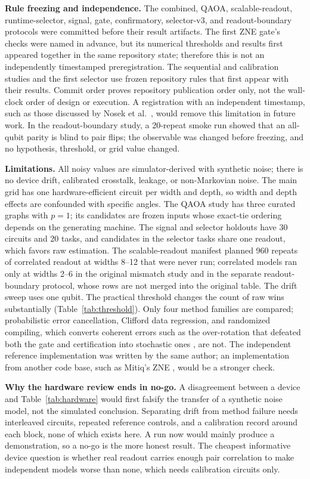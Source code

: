 \documentclass[10pt,twocolumn]{article}
\newcommand{\paragraphlead}[1]{\textbf{#1}\quad}
\begin{document}
\paragraphlead{Rule freezing and independence.}
The combined, QAOA, scalable-readout, runtime-selector, signal, gate, confirmatory, selector-v3, and
readout-boundary protocols were committed before their result artifacts. The first ZNE gate's checks
were named in advance, but its numerical thresholds and results first appeared together in the same
repository state; therefore this is not an independently timestamped preregistration. The
sequential and calibration studies and the first selector use frozen repository rules that first
appear with their results. Commit order proves repository publication order only, not the
wall-clock order of design or execution. A registration with an independent timestamp, such as those
discussed by Nosek et al.\ \cite{nosek2018}, would remove this limitation in future work. In the readout-boundary study, a 20-repeat smoke run showed
that an all-qubit parity is blind to pair flips; the observable was changed before freezing, and no
hypothesis, threshold, or grid value changed.

\paragraphlead{Limitations.}
All noisy values are simulator-derived with synthetic noise; there is no device drift, calibrated
crosstalk, leakage, or non-Markovian noise. The main grid has one hardware-efficient circuit per
width and depth, so width and depth effects are confounded with specific angles. The QAOA study has
three curated graphs with $p=1$; its candidates are frozen inputs whose exact-tie ordering depends on
the generating machine. The signal and selector holdouts have 30 circuits and 20 tasks, and
candidates in the selector tasks share one readout, which favors raw estimation. The scalable-readout
manifest planned 960 repeats of correlated readout at widths 8--12 that were never run; correlated
models ran only at widths 2--6 in the original mismatch study and in the separate readout-boundary
protocol, whose rows are not merged into the original table. The drift sweep uses one qubit. The
practical threshold changes the count of raw wins substantially (Table~\ref{tab:threshold}).
Only four method families are compared; probabilistic error cancellation, Clifford data regression,
and randomized compiling, which converts coherent errors such as the over-rotation that defeated
both the gate and certification into stochastic ones \cite{wallman2016}, are not. The independent
reference implementation was written by the same author; an implementation from another code base,
such as Mitiq's ZNE \cite{larose2022}, would be a stronger check.

\paragraphlead{Why the hardware review ends in no-go.}
A disagreement between a device and Table~\ref{tab:hardware} would first falsify the transfer of a
synthetic noise model, not the simulated conclusion. Separating drift from method failure needs
interleaved circuits, repeated reference controls, and a calibration record around each block, none
of which exists here. A run now would mainly produce a demonstration, so a no-go is the more honest
result. The cheapest informative device question is whether real readout carries enough pair
correlation to make independent models worse than none, which needs calibration circuits only.
\end{document}
